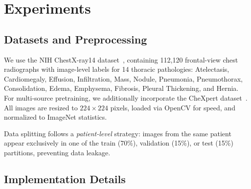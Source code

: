 \section{Experiments}
\label{sec:experiments}

\subsection{Datasets and Preprocessing}

We use the NIH ChestX-ray14 dataset~\cite{wang2017chestxray}, containing 112,120 frontal-view chest radiographs with image-level labels for 14 thoracic pathologies: Atelectasis, Cardiomegaly, Effusion, Infiltration, Mass, Nodule, Pneumonia, Pneumothorax, Consolidation, Edema, Emphysema, Fibrosis, Pleural Thickening, and Hernia. For multi-source pretraining, we additionally incorporate the CheXpert dataset~\cite{irvin2019chexpert}. All images are resized to $224 \times 224$ pixels, loaded via OpenCV for speed, and normalized to ImageNet statistics.

Data splitting follows a \textit{patient-level} strategy: images from the same patient appear exclusively in one of the train (70\%), validation (15\%), or test (15\%) partitions, preventing data leakage.

\subsection{Implementation Details}

